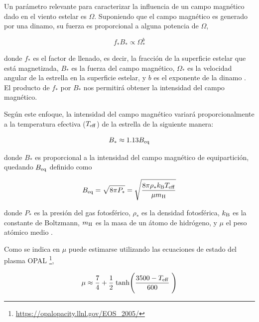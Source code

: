 Un parámetro relevante para caracterizar la influencia de un campo magnético dado en el viento estelar es $\Omega$. Suponiendo que el campo magnético es generado por una dinamo, su fuerza es proporcional a alguna potencia de $\Omega$,

\begin{ceqn}
	\begin{equation}
		f_*B_* \propto \Omega_*^b \label{eq:mf_strenght}
	\end{equation}
\end{ceqn}

donde $f_*$ es el factor de llenado, es decir, la fracción de la superficie estelar que está magnetizada, $B_*$ es la fuerza del campo magnético, $\Omega_*$ es la velocidad angular de la estrella en la superficie estelar, y $b$ es el exponente de la dinamo \cite{Gallet2013}. El producto de $f_*$ por $B_*$ nos permitirá obtener la intensidad del campo magnético. \par

Según este enfoque, la intensidad del campo magnético variará proporcionalmente a la temperatura efectiva ($T_{\mathrm{eff}}$) de la estrella de la siguiente manera: 
\begin{ceqn}
	\begin{equation}
		B_* \approx 1.13 B_{\mathrm{eq}} \label{eq:mf_bstar}
	\end{equation}
\end{ceqn}

donde $B_*$ es proporcional a la intensidad del campo magnético de equipartición, quedando $B_{\mathrm{eq}}$ definido como 

\begin{ceqn}
	\begin{equation}
		B_{\mathrm{eq}} = \sqrt{8\pi P_*} = \sqrt{\frac{8\pi\rho_* k_{\mathrm{B}} T_{\mathrm{eff}}}{\mu m_{\mathrm{H}}}}\label{eq:mf_beq}    
	\end{equation}
\end{ceqn}

donde $P_*$ es la presión del gas fotosférico, $\rho_*$ es la densidad fotosférica, $k_{\mathrm{B}}$ es la constante de Boltzmann, $m_{\mathrm{H}}$ es la masa de un átomo de hidrógeno, y $\mu$ el peso atómico medio \cite{Cranmer2011}. \par

Como se indica en \cite{Cranmer2011} $\mu$ puede estimarse utilizando las ecuaciones de estado del plasma OPAL \footnote{\url{https://opalopacity.llnl.gov/EOS_2005/}},

\begin{ceqn}
	\begin{equation}
		\mu \approx \frac{7}{4} + \frac{1}{2} \; \textrm{tanh}\Bigg(\frac{3500-T_{\mathrm{eff}}}{600}\;\Bigg) \label{eq:mf_atom_weight}
	\end{equation}
\end{ceqn}


